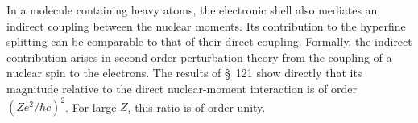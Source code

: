 In a molecule containing heavy atoms, the electronic shell also mediates an indirect coupling between the nuclear moments.
Its contribution to the hyperfine splitting can be comparable to that of their direct coupling.
Formally, the indirect contribution arises in second-order perturbation theory from the coupling of a nuclear spin to the electrons.
The results of \S~121 show directly that its magnitude relative to the direct nuclear-moment interaction is of order $(Ze^2/\hbar c)^2$.
For large $Z$, this ratio is of order unity.

